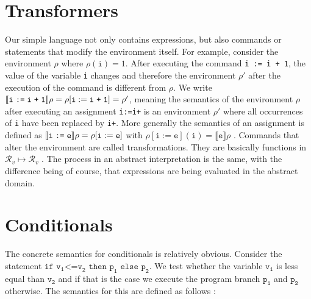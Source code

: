 \section{Transformers}

Our simple language not only contains expressions, but also commands or statements that modify the environment itself. For example, consider the environment $\rho$ where $\rho(\mathtt{i})=1$. After executing the command \texttt{i := i + 1}, the value of the variable \texttt{i} changes and therefore the environment $\rho'$ after the execution of the command is different from $\rho$. We write $\llbracket \texttt{i\;:=\;i\;+\;1} \rrbracket\rho=\rho[\mathtt{i}:=\texttt{i\;+\;1}]=\rho'$, meaning the semantics of the environment $\rho$ after executing an assignment \texttt{i\;:=\;i\;+} is an environment $\rho'$ where all occurrences of \texttt{i} have been replaced by \texttt{i\;+}. 
More generally the semantics of an assignment is defined as $\llbracket \texttt{i\;:=\;e} \rrbracket\rho=\rho[\mathtt{i}:=\texttt{e}]$ with $\rho[\mathtt{i}:=\texttt{e}](\mathtt{i})=\llbracket\mathtt{e}\rrbracket\rho$ \cite{cousot2011}. Commands that alter the environment are called transformations. They are basically functions in $\mathcal{R}_v\mapsto\mathcal{R}_v$ \cite{scott1971}.
The process in an abstract interpretation is the same, with the difference being of course, that expressions are being evaluated in the abstract domain.

\section{Conditionals}\label{sec:conditionals}

The concrete semantics for conditionals is relatively obvious. Consider the statement $\texttt{if v}_\texttt{1}\texttt{<=v}_\texttt{2} \texttt{ then p}_\texttt{1} \texttt{ else p}_\texttt{2}$. We test whether the variable $\texttt{v}_\texttt{1}$ is less equal than $\texttt{v}_\texttt{2}$ and if that is the case we execute the program branch $\texttt{p}_\texttt{1}$ and $\texttt{p}_\texttt{2}$ otherwise. The semantics for this are defined as follows \cite{scott1971}: 

